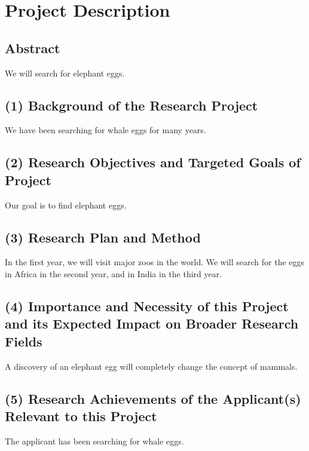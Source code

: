 
\section{Project Description}

	\vspace*{-12mm}
\subsection*{Abstract}
	We will search for elephant eggs.
	
\subsection*{(1) Background of the Research Project}
	We have been searching for whale eggs for many years.
	
\subsection*{(2) Research Objectives and Targeted Goals of Project}
	Our goal is to find elephant eggs.

\subsection*{(3) Research Plan and Method}
	In the first year, we will visit major zoos in the world.
	We will search for the eggs in Africa in the second year, 
	and in India in the third year.
	
\subsection*{(4) Importance and Necessity of this Project and its Expected Impact on Broader Research Fields}
	A discovery of an elephant egg will completely change the concept of mammals.

\subsection*{(5) Research Achievements of the Applicant(s) Relevant to this Project}
	The applicant has been searching for whale eggs.
	
\JSPSInstructions	%




